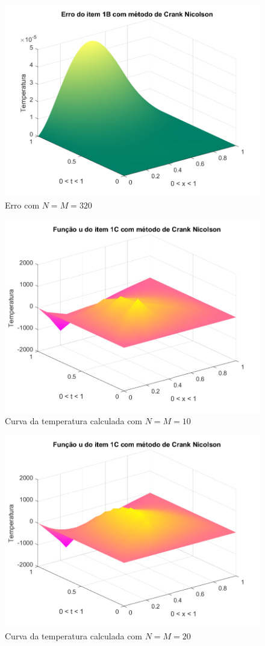 \documentclass[12pt]{article}
\begin{document}
\begin{spacing}{1.5}
\begin{figure}
    \centering
    \includegraphics[width=0.8\linewidth]{Segunda_Tarefa/ItemC/nm320_erro_B.png}
    \caption{Erro com $N=M=320$}
    \label{fig:CB_nm320_erro}
\end{figure}

\begin{figure}
    \centering
    \includegraphics[width=0.8\linewidth]{Segunda_Tarefa/ItemC/nm10_calculada_C.png}
    \caption{Curva da temperatura calculada com $N=M=10$}
    \label{fig:CC_nm10_calculada}
\end{figure}

\begin{figure}
    \centering
    \includegraphics[width=0.8\linewidth]{Segunda_Tarefa/ItemC/nm20_calculada_C.png}
    \caption{Curva da temperatura calculada com $N=M=20$}
    \label{fig:CC_nm20_calculada}
\end{figure}


\end{spacing}
\end{document}
